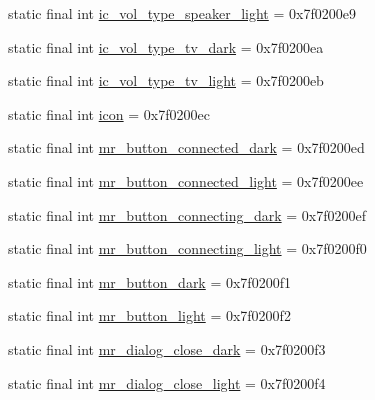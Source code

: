 \begin{CompactItemize}
\item 
static final int \hyperlink{classandroid_1_1support_1_1v7_1_1appcompat_1_1_r_1_1drawable_75b6820c63dc806ce9c7e7e9c7efae34}{ic\_\-vol\_\-type\_\-speaker\_\-light} = 0x7f0200e9
\item 
static final int \hyperlink{classandroid_1_1support_1_1v7_1_1appcompat_1_1_r_1_1drawable_ca703dfd59313330b91c9bce7670fd1c}{ic\_\-vol\_\-type\_\-tv\_\-dark} = 0x7f0200ea
\item 
static final int \hyperlink{classandroid_1_1support_1_1v7_1_1appcompat_1_1_r_1_1drawable_f73080617e2ec06ac43294e1f2722eed}{ic\_\-vol\_\-type\_\-tv\_\-light} = 0x7f0200eb
\item 
static final int \hyperlink{classandroid_1_1support_1_1v7_1_1appcompat_1_1_r_1_1drawable_c2c00d61bae5894037eb99163662e4a5}{icon} = 0x7f0200ec
\item 
static final int \hyperlink{classandroid_1_1support_1_1v7_1_1appcompat_1_1_r_1_1drawable_bce611b6ad251bf820575bb9f9aca31b}{mr\_\-button\_\-connected\_\-dark} = 0x7f0200ed
\item 
static final int \hyperlink{classandroid_1_1support_1_1v7_1_1appcompat_1_1_r_1_1drawable_69c10ae5a82f93e17e741830a8e8b8b8}{mr\_\-button\_\-connected\_\-light} = 0x7f0200ee
\item 
static final int \hyperlink{classandroid_1_1support_1_1v7_1_1appcompat_1_1_r_1_1drawable_2d807a2a2640be3bfd37503189fc2d9c}{mr\_\-button\_\-connecting\_\-dark} = 0x7f0200ef
\item 
static final int \hyperlink{classandroid_1_1support_1_1v7_1_1appcompat_1_1_r_1_1drawable_795f5e1fd7aa0005db36299bd56918ef}{mr\_\-button\_\-connecting\_\-light} = 0x7f0200f0
\item 
static final int \hyperlink{classandroid_1_1support_1_1v7_1_1appcompat_1_1_r_1_1drawable_b9904008def9cc41945f24e812cd215b}{mr\_\-button\_\-dark} = 0x7f0200f1
\item 
static final int \hyperlink{classandroid_1_1support_1_1v7_1_1appcompat_1_1_r_1_1drawable_108233984b6836e507c0e4a96141bfe2}{mr\_\-button\_\-light} = 0x7f0200f2
\item 
static final int \hyperlink{classandroid_1_1support_1_1v7_1_1appcompat_1_1_r_1_1drawable_7b072969284d215d93248a1ce8a40c17}{mr\_\-dialog\_\-close\_\-dark} = 0x7f0200f3
\item 
static final int \hyperlink{classandroid_1_1support_1_1v7_1_1appcompat_1_1_r_1_1drawable_7b17991f025dee0f5786dc59af39de00}{mr\_\-dialog\_\-close\_\-light} = 0x7f0200f4
\item 

\end{CompactItemize}
